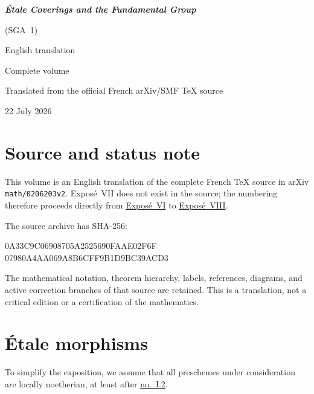 \documentclass[11pt,oneside]{amsbook}
\theoremstyle{remark}
\theoremstyle{plain}
\numberwithin{equation}{section}
\begin{document}
\frontmatter
\begin{titlepage}
  \centering
  \vspace*{35mm}
  {\Huge\bfseries \textit{Étale Coverings and the Fundamental Group}\par}
  \vspace{3mm}
  {\LARGE (SGA~1)\par}
  \vspace{20mm}
  {\Large English translation\par}
  \vspace{3mm}
  {\Large Complete volume\par}
  \vfill
  {\large Translated from the official French arXiv/SMF \TeX{} source\par}
  \vspace{5mm}
  {\large 22 July 2026\par}
\end{titlepage}

\chapter*{Source and status note}

This volume is an English translation of the complete French \TeX{} source in
arXiv \texttt{math/0206203v2}.  Exposé~VII does not exist in the source; the
numbering therefore proceeds directly from \hyperref[VI]{Exposé~VI} to
\hyperref[VIII]{Exposé~VIII}.

The source archive has SHA-256:
\begin{center}
  \small\ttfamily
  0A33C9C06908705A2525690FAAE02F6F\\
  07980A4AA069A8B6CFF9B1D9BC39ACD3
\end{center}
The mathematical notation, theorem hierarchy, labels, references, diagrams,
and active correction branches of that source are retained.  This is a
translation, not a critical edition or a certification of the mathematics.

\tableofcontents

\mainmatter
\setcounter{chapter}{0}
\chapter{Étale morphisms}
\label{I}

To simplify the exposition, we assume that all preschemes under
consideration are locally noetherian, at least after
\hyperref[I.2]{no.~I.2}.
\end{document}
